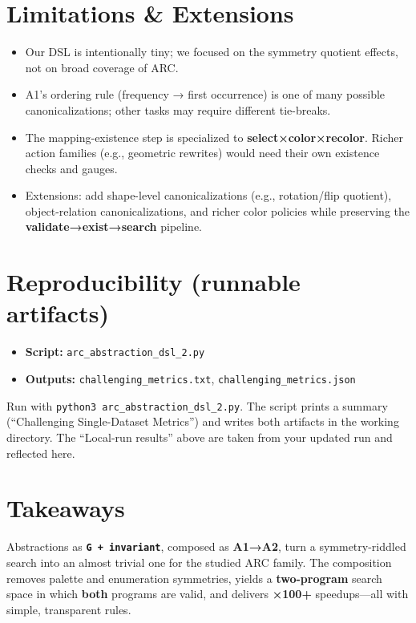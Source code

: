 \documentclass[11pt]{article}
\newcommand{\code}[1]{\texttt{#1}}
\begin{document}
\section{Limitations \& Extensions}

\begin{itemize}
\item Our DSL is intentionally tiny; we focused on the symmetry quotient effects, not on broad coverage of ARC.
\item A1's ordering rule (frequency → first occurrence) is one of many possible canonicalizations; other tasks may require different tie-breaks.
\item The mapping-existence step is specialized to \textbf{select×color×recolor}. Richer action families (e.g., geometric rewrites) would need their own existence checks and gauges.
\item Extensions: add shape-level canonicalizations (e.g., rotation/flip quotient), object-relation canonicalizations, and richer color policies while preserving the \textbf{validate→exist→search} pipeline.
\end{itemize}

\section{Reproducibility (runnable artifacts)}

\begin{itemize}
\item \textbf{Script:} \code{arc\_abstraction\_dsl\_2.py}
\item \textbf{Outputs:} \code{challenging\_metrics.txt}, \code{challenging\_metrics.json}
\end{itemize}

Run with \code{python3 arc\_abstraction\_dsl\_2.py}. The script prints a summary (``Challenging Single-Dataset Metrics'') and writes both artifacts in the working directory. The ``Local-run results'' above are taken from your updated run and reflected here.

\section{Takeaways}

Abstractions as \textbf{\code{G + invariant}}, composed as \textbf{A1→A2}, turn a symmetry-riddled search into an almost trivial one for the studied ARC family. The composition removes palette and enumeration symmetries, yields a \textbf{two-program} search space in which \textbf{both} programs are valid, and delivers \textbf{×100+} speedups---all with simple, transparent rules.
\end{document}
